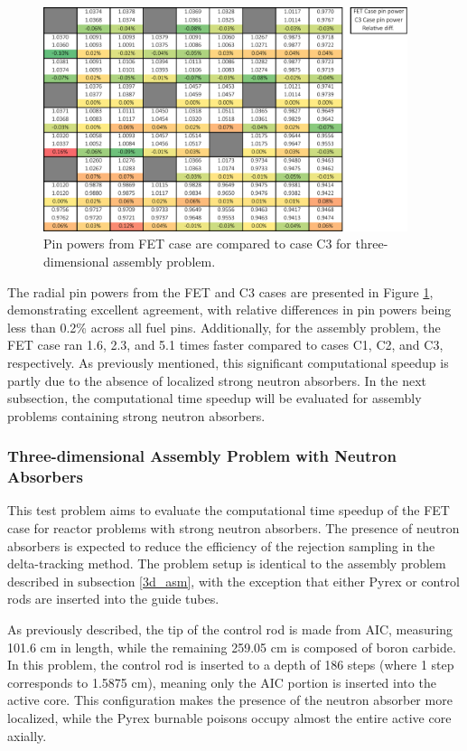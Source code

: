 \begin{figure}
    \centering
    \includegraphics[width=0.95\textwidth]{figs/pin_powers.pdf}
    \caption[Pin powers comparisons for three-dimensional assembly problem.]{Pin powers from FET case are compared to case C3 for three-dimensional assembly problem.}
    \label{fig_47}
\end{figure}

The radial pin powers from the FET and C3 cases are presented in Figure \ref{fig_47}, demonstrating excellent agreement, with relative differences in pin powers being less than 0.2\% across all fuel pins. Additionally, for the assembly problem, the FET case ran 1.6, 2.3, and 5.1 times faster compared to cases C1, C2, and C3, respectively. As previously mentioned, this significant computational speedup is partly due to the absence of localized strong neutron absorbers. In the next subsection, the computational time speedup will be evaluated for assembly problems containing strong neutron absorbers.

\subsubsection{Three-dimensional Assembly Problem with Neutron Absorbers}

This test problem aims to evaluate the computational time speedup of the FET case for reactor problems with strong neutron absorbers. The presence of neutron absorbers is expected to reduce the efficiency of the rejection sampling in the delta-tracking method. The problem setup is identical to the assembly problem described in subsection \ref{3d_asm}, with the exception that either Pyrex or control rods are inserted into the guide tubes.

As previously described, the tip of the control rod is made from AIC, measuring 101.6 cm in length, while the remaining 259.05 cm is composed of boron carbide. In this problem, the control rod is inserted to a depth of 186 steps (where 1 step corresponds to 1.5875 cm), meaning only the AIC portion is inserted into the active core. This configuration makes the presence of the neutron absorber more localized, while the Pyrex burnable poisons occupy almost the entire active core axially.

